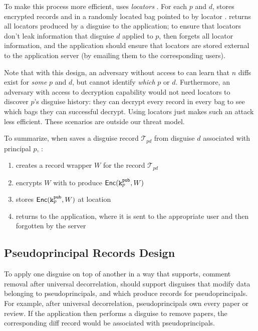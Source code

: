 To make this process more efficient, \sys uses \emph{locators }. For each $p$ and $d$,
\sys stores encrypted records  and  in a randomly located bag pointed to by
locator . \sys returns all locators produced by a disguise to the application; to ensure
that locators don't leak information that disguise $d$ applied to $p$, \sys then forgets all locator
information, and the application should ensure that locators are stored external to the application
server (\eg by emailing them to the corresponding users).

Note that with this design, an adversary without access to  can learn that $n$ diffs exist
for \emph{some} $p$ and $d$, but cannot identify \emph{which} $p$ or $d$.
%
Furthermore, an adversary with access to decryption capability  would not need locators to
discover $p$'s disguise history: they can decrypt every record in every bag to see which bags they
can successful decrypt. Using locators just makes such an attack less efficient.
%
These scenarios are outside our threat model.


To summarize, when \sys saves a disguise record $\mathcal{T}_{pd}$ from disguise $d$ associated with principal $p$, \sys:
\begin{enumerate}
    \item creates a record wrapper $W$ for the record $\mathcal{T}_{pd}$
    \item encrypts $W$ with  to produce $\mathsf{Enc}(\texttt{\ensuremath{\texttt{k}^{\text{pub}}_{p}}}, W)$
    \item stores $\mathsf{Enc}(\texttt{\ensuremath{\texttt{k}^{\text{pub}}_{p}}}, W)$ at location 
    \item returns  to the application, where it is sent to the appropriate user and then
        forgotten by the server
\end{enumerate}

\subsection{Pseudoprincipal Records Design}

To apply one disguise on top of another in a way that supports, \eg comment removal after universal
decorrelation, \sys should support disguises that modify data belonging to pseudoprincipals, and which
produce records for pseudoprincipals.
%
For example, after universal decorrelation, pseudoprincipals own every paper or review. If the
application then performs a disguise to remove papers, the corresponding diff record would be
associated with pseudoprincipals.

